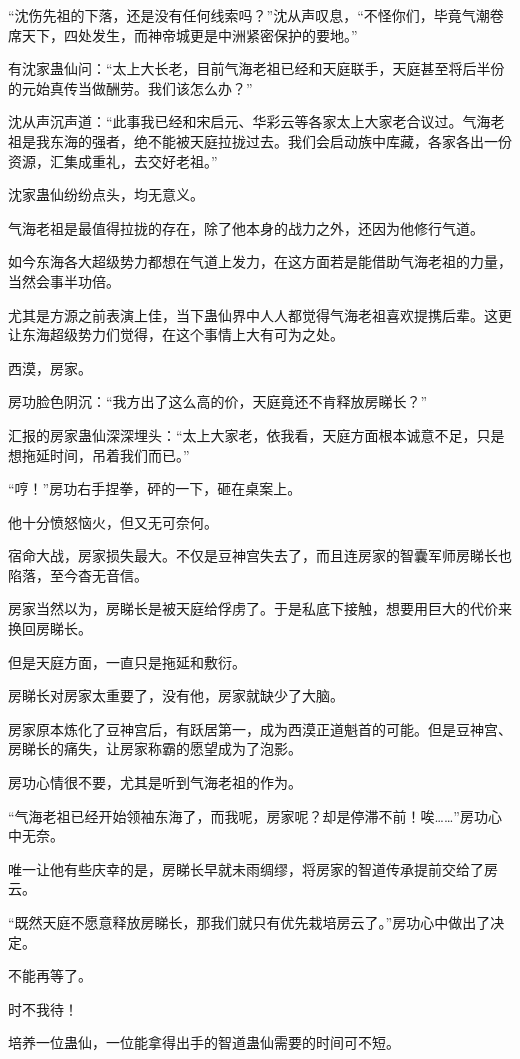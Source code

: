 \begin{this_body}
“沈伤先祖的下落，还是没有任何线索吗？”沈从声叹息，“不怪你们，毕竟气潮卷席天下，四处发生，而神帝城更是中洲紧密保护的要地。”

有沈家蛊仙问：“太上大长老，目前气海老祖已经和天庭联手，天庭甚至将后半份的元始真传当做酬劳。我们该怎么办？”

沈从声沉声道：“此事我已经和宋启元、华彩云等各家太上大家老合议过。气海老祖是我东海的强者，绝不能被天庭拉拢过去。我们会启动族中库藏，各家各出一份资源，汇集成重礼，去交好老祖。”

沈家蛊仙纷纷点头，均无意义。

气海老祖是最值得拉拢的存在，除了他本身的战力之外，还因为他修行气道。

如今东海各大超级势力都想在气道上发力，在这方面若是能借助气海老祖的力量，当然会事半功倍。

尤其是方源之前表演上佳，当下蛊仙界中人人都觉得气海老祖喜欢提携后辈。这更让东海超级势力们觉得，在这个事情上大有可为之处。

西漠，房家。

房功脸色阴沉：“我方出了这么高的价，天庭竟还不肯释放房睇长？”

汇报的房家蛊仙深深埋头：“太上大家老，依我看，天庭方面根本诚意不足，只是想拖延时间，吊着我们而已。”

“哼！”房功右手捏拳，砰的一下，砸在桌案上。

他十分愤怒恼火，但又无可奈何。

宿命大战，房家损失最大。不仅是豆神宫失去了，而且连房家的智囊军师房睇长也陷落，至今杳无音信。

房家当然以为，房睇长是被天庭给俘虏了。于是私底下接触，想要用巨大的代价来换回房睇长。

但是天庭方面，一直只是拖延和敷衍。

房睇长对房家太重要了，没有他，房家就缺少了大脑。

房家原本炼化了豆神宫后，有跃居第一，成为西漠正道魁首的可能。但是豆神宫、房睇长的痛失，让房家称霸的愿望成为了泡影。

房功心情很不要，尤其是听到气海老祖的作为。

“气海老祖已经开始领袖东海了，而我呢，房家呢？却是停滞不前！唉……”房功心中无奈。

唯一让他有些庆幸的是，房睇长早就未雨绸缪，将房家的智道传承提前交给了房云。

“既然天庭不愿意释放房睇长，那我们就只有优先栽培房云了。”房功心中做出了决定。

不能再等了。

时不我待！

培养一位蛊仙，一位能拿得出手的智道蛊仙需要的时间可不短。


\end{this_body}
